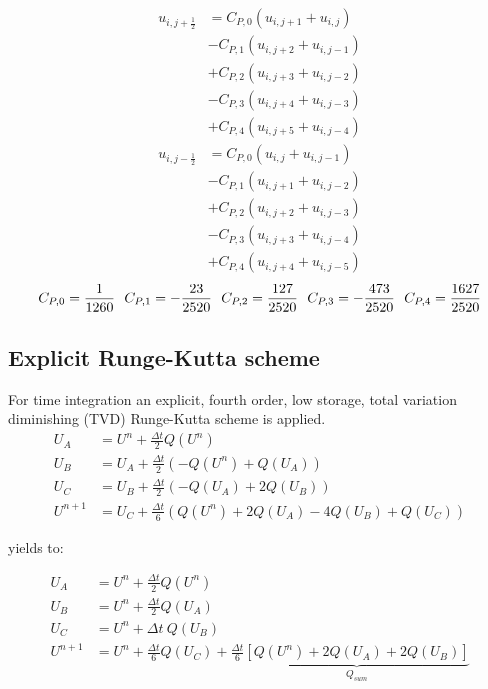 \begin{eqnarray}
u_{i,j+\frac{1}{2}}&=
C_{P,0}\left(u_{i,j+1}+u_{i,j} \right)\\ \nonumber
&-C_{P,1}\left(u_{i,j+2}+u_{i,j-1} \right)\\ \nonumber
&+C_{P,2}\left(u_{i,j+3}+u_{i,j-2} \right)\\ \nonumber
&-C_{P,3}\left(u_{i,j+4}+u_{i,j-3} \right)\\ \nonumber
&+C_{P,4}\left(u_{i,j+5}+u_{i,j-4} \right)
\\
u_{i,j-\frac{1}{2}}&=
C_{P,0}\left(u_{i,j}+u_{i,j-1} \right)\\ \nonumber
&-C_{P,1}\left(u_{i,j+1}+u_{i,j-2} \right)\\ \nonumber
&+C_{P,2}\left(u_{i,j+2}+u_{i,j-3} \right)\\ \nonumber
&-C_{P,3}\left(u_{i,j+3}+u_{i,j-4} \right)\\ \nonumber
&+C_{P,4}\left(u_{i,j+4}+u_{i,j-5} \right)
\end{eqnarray}
\begin{equation}
C_{P,0}=\frac{1}{1260}\ \ 
C_{P,1}=-\frac{23}{2520}\ \ 
C_{P,2}=\frac{127}{2520}\ \ 
C_{P,3}=-\frac{473}{2520}\ \ 
C_{P,4}=\frac{1627}{2520}\\
\end{equation}

\subsection{Explicit Runge-Kutta scheme}
For time integration an explicit, fourth order, low storage, total variation diminishing (TVD) Runge-Kutta scheme is applied.
\begin{eqnarray}
U_{A}&=U^{n}+ \frac{\varDelta t}{2} Q\left(U^{n}\right)\\
U_{B}&=U_{A}+ \frac{\varDelta t}{2} \left(-Q\left(U^{n}\right)+Q\left(U_{A}\right)\right)\\
U_{C}&=U_{B}+ \frac{\varDelta t}{2} \left(-Q\left(U_{A}\right)+2Q\left(U_{B}\right)\right)\\
U^{n+1}&=U_{C}+\frac{\varDelta t}{6} \left(Q\left(U^{n}\right)+2Q\left(U_{A}\right)-4Q\left(U_{B}\right)+Q\left(U_{C}\right)\right)
\end{eqnarray}

yields to:

\begin{eqnarray}
U_{A}&= U^{n}+ \frac{\varDelta t}{2} Q\left(U^{n}\right)\\
U_{B}&=U^{n}+ \frac{\varDelta t}{2} Q\left(U_{A}\right)\\
U_{C}&=U^{n}+ \varDelta t\ Q\left(U_{B}\right)\\
U^{n+1}&=U^{n}+\frac{\varDelta t}{6}Q\left(U_{C}\right)+\frac{\varDelta t}{6} \underbrace{ \left[Q\left(U^{n}\right)+2 Q\left(U_{A}\right)+2 Q\left(U_{B}\right)\right]}_{Q_{sum}}
\end{eqnarray}